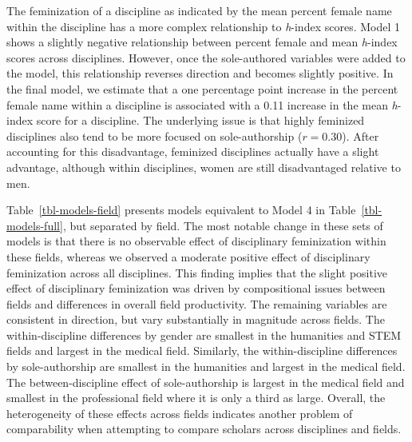 \documentclass[
  10pt,
  letterpaper,
]{article}
\begin{document}
The feminization of a discipline as indicated by the mean percent female
name within the discipline has a more complex relationship to
\emph{h}-index scores. Model 1 shows a slightly negative relationship
between percent female and mean \emph{h}-index scores across
disciplines. However, once the sole-authored variables were added to the
model, this relationship reverses direction and becomes slightly
positive. In the final model, we estimate that a one percentage point
increase in the percent female name within a discipline is associated
with a 0.11 increase in the mean \emph{h}-index score for a discipline.
The underlying issue is that highly feminized disciplines also tend to
be more focused on sole-authorship (\(r=0.30\)). After accounting for
this disadvantage, feminized disciplines actually have a slight
advantage, although within disciplines, women are still disadvantaged
relative to men.

Table~\ref{tbl-models-field} presents models equivalent to Model 4 in
Table~\ref{tbl-models-full}, but separated by field. The most notable
change in these sets of models is that there is no observable effect of
disciplinary feminization within these fields, whereas we observed a
moderate positive effect of disciplinary feminization across all
disciplines. This finding implies that the slight positive effect of
disciplinary feminization was driven by compositional issues between
fields and differences in overall field productivity. The remaining
variables are consistent in direction, but vary substantially in
magnitude across fields. The within-discipline differences by gender are
smallest in the humanities and STEM fields and largest in the medical
field. Similarly, the within-discipline differences by sole-authorship
are smallest in the humanities and largest in the medical field. The
between-discipline effect of sole-authorship is largest in the medical
field and smallest in the professional field where it is only a third as
large. Overall, the heterogeneity of these effects across fields
indicates another problem of comparability when attempting to compare
scholars across disciplines and fields.
\end{document}
